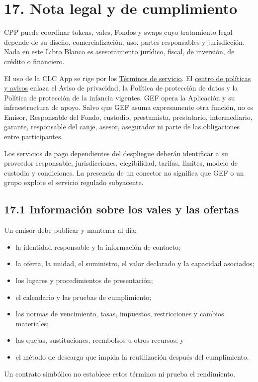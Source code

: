 \documentclass[11pt]{article}
\begin{document}
\section*{17. Nota legal y de cumplimiento}

CPP puede coordinar tokens, vales, Fondos y swaps cuyo tratamiento legal depende de su diseño, comercialización, uso, partes responsables y jurisdicción. Nada en este Libro Blanco es asesoramiento jurídico, fiscal, de inversión, de crédito o financiero.

El uso de la CLC App se rige por los \href{https://docs.cosmolocal.credit/es/governance/terms}{Términos de servicio}. El \href{https://docs.cosmolocal.credit/es/governance/policies}{centro de políticas y avisos} enlaza el Aviso de privacidad, la Política de protección de datos y la Política de protección de la infancia vigentes. GEF opera la Aplicación y su infraestructura de apoyo. Salvo que GEF asuma expresamente otra función, no es Emisor, Responsable del Fondo, custodio, prestamista, prestatario, intermediario, garante, responsable del canje, asesor, asegurador ni parte de las obligaciones entre participantes.

Los servicios de pago dependientes del despliegue deberán identificar a su proveedor responsable, jurisdicciones, elegibilidad, tarifas, límites, modelo de custodia y condiciones. La presencia de un conector no significa que GEF o un grupo explote el servicio regulado subyacente.

\subsection*{17.1 Información sobre los vales y las ofertas}

Un emisor debe publicar y mantener al día:

\begin{itemize}[leftmargin=*]
\item la identidad responsable y la información de contacto;
\item la oferta, la unidad, el suministro, el valor declarado y la capacidad asociados;
\item los lugares y procedimientos de presentación;
\item el calendario y las pruebas de cumplimiento;
\item las normas de vencimiento, tasas, impuestos, restricciones y cambios materiales;
\item las quejas, sustituciones, reembolsos u otros recursos; y
\item el método de descarga que impida la reutilización después del cumplimiento.
\end{itemize}
Un contrato simbólico no establece estos términos ni prueba el rendimiento.
\end{document}
